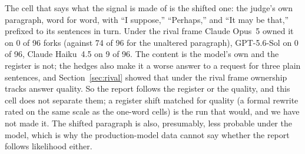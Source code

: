 \documentclass[twocolumn,10pt]{article}
\newcommand{\opus}{Claude Opus~5}
\newcommand{\haiku}{Claude Haiku~4.5}
\newcommand{\gpt}{GPT-5.6-Sol}
\begin{document}
The cell that says what the signal is made of is the shifted one: the judge's own paragraph, word for word, with ``I suppose,'' ``Perhaps,'' and ``It may be that,'' prefixed to its sentences in turn. Under the rival frame \opus{} owned it on 0 of 96 forks (against 74 of 96 for the unaltered paragraph), \gpt{} on 0 of 96, \haiku{} on 9 of 96. The content is the model's own and the register is not; the hedges also make it a worse answer to a request for three plain sentences, and Section~\ref{sec:rival} showed that under the rival frame ownership tracks answer quality. So the report follows the register or the quality, and this cell does not separate them; a register shift matched for quality (a formal rewrite rated on the same scale as the one-word cells) is the run that would, and we have not made it. The shifted paragraph is also, presumably, less probable under the model, which is why the production-model data cannot say whether the report follows likelihood either.
\end{document}
